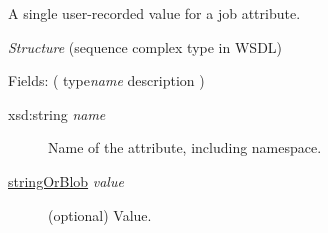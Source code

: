 A single user-recorded value for a job attribute.

{\em{Structure}} (sequence complex type in WSDL)

Fields: ( type{\ttfamily\itshape{{name}}} description )

\begin{description}
\item[{xsd:string {\ttfamily\itshape{{name}}}}]\null{}
Name of the attribute, including namespace.
\item[{\hyperlink{type:stringOrBlob}{stringOrBlob} {\ttfamily\itshape{{value}}}}]\null{}
(optional) Value.
\end{description}
\noindent 